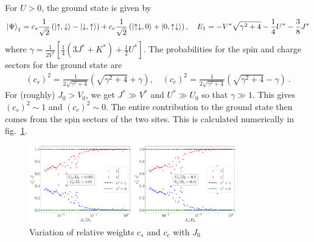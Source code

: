 For \(U>0\), the ground state is given by
\begin{gather}
	\label{gstate}
	\ket{\Psi}_\text{1} = c_s \frac{1}{\sqrt 2}\left(\ket{\uparrow, \downarrow} - \ket{\downarrow, \uparrow}\right) + c_c \frac{1}{\sqrt 2}\left(\ket{\uparrow\downarrow, 0} + \ket{0, \uparrow\downarrow}\right), \quad E_1 =  -V^*\sqrt{\gamma^2 + 4} -\frac{1}{4}U^* - \frac{3}{8}{J^*}
\end{gather}
where $\gamma = \frac{1}{2{V^*}}\left[ \frac{1}{4}\left( 3J^* + K^* \right) + \frac{1}{2}U^* \right]$. The probabilities for the spin and charge sectors for the ground state are
\begin{equation}\begin{aligned}
	\label{coeff_def}
	\left(c_s\right)^2 = \frac{1}{2\sqrt{\gamma^2 + 4}}\left(\sqrt{\gamma^2 + 4} + \gamma\right), \quad \left(c_c \right)^2 = \frac{1}{2\sqrt{\gamma^2 + 4}}\left(\sqrt{\gamma^2 + 4} - \gamma\right)~.
\end{aligned}\end{equation}
For (roughly) \(J_0 > V_0\), we get \(J^* \gg V^*\) and \(U^* \gg U_0\) so that \(\gamma \gg 1\). This gives \(\left( c_s \right) ^2 \sim 1\) and \(\left( c_c \right) ^2 \sim 0\). The entire contribution to the ground state then comes from the spin sectors of the two sites. This is calculated numerically in fig.~\ref{cs_cc}.
\begin{figure}[htpb]
	\centering
	\includegraphics[width=0.8\textwidth]{../figures/coeffs_vs_J.pdf}
	\caption{Variation of relative weights \(c_s\) and \(c_c\) with \(J_0\)}
	\label{cs_cc}
\end{figure}

